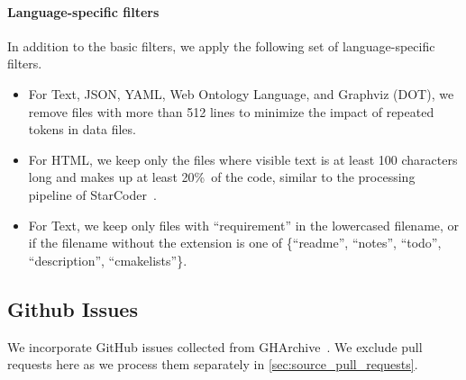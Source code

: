 \documentclass[10pt]{article} %
\begin{document}
\paragraph{Language-specific filters} In addition to the basic filters, we apply the following set of language-specific filters. 
\begin{itemize}
\item For Text, JSON, YAML, Web Ontology Language, and Graphviz (DOT), we remove files with more than 512 lines to minimize the impact of repeated tokens in data files.

\item For HTML, we keep only the files where visible text is at least 100 characters long and makes up at least 20\%~of the code, similar to the processing pipeline of StarCoder~\citep{li2023starcoder}.

\item For Text, we keep only files with ``requirement'' in the lowercased filename, or if the filename without the extension is one of \{``readme'', ``notes'', ``todo'', ``description'', ``cmakelists''\}.
\end{itemize}

\subsection{Github Issues}\label{sec:source_issues}
We incorporate GitHub issues collected from GHArchive~\citep{gharchive}. We exclude pull requests here as we process them separately in \cref{sec:source_pull_requests}. 
\end{document}
